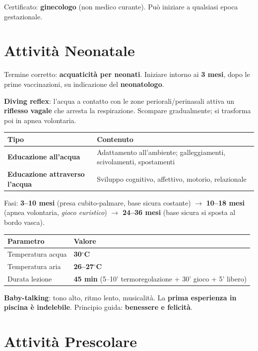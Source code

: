 \documentclass[12pt, a4paper]{article}
\begin{document}
Certificato: \textbf{ginecologo} (non medico curante). Può iniziare a qualsiasi epoca gestazionale.

\section{Attività Neonatale}

Termine corretto: \textbf{acquaticità per neonati}. Iniziare intorno ai \textbf{3 mesi}, dopo le prime vaccinazioni, su indicazione del \textbf{neonatologo}.

\textbf{Diving reflex}: l'acqua a contatto con le zone periorali/perinasali attiva un \textbf{riflesso vagale} che arresta la respirazione. Scompare gradualmente; si trasforma poi in apnea volontaria.

\begin{tabularx}{\textwidth}{lX}
\toprule
\rowcolor{light} \textbf{Tipo} & \textbf{Contenuto} \\
\midrule
\textbf{Educazione all'acqua} & Adattamento all'ambiente; galleggiamenti, scivolamenti, spostamenti \\
\textbf{Educazione attraverso l'acqua} & Sviluppo cognitivo, affettivo, motorio, relazionale \\
\bottomrule
\end{tabularx}

\medskip
Fasi: \textbf{3--10 mesi} (presa cubito-palmare, base sicura costante) $\rightarrow$ \textbf{10--18 mesi} (apnea volontaria, \textit{gioco euristico}) $\rightarrow$ \textbf{24--36 mesi} (base sicura si sposta al bordo vasca).

\begin{tabular}{ll}
\toprule
\rowcolor{light} \textbf{Parametro} & \textbf{Valore} \\
\midrule
Temperatura acqua & \textbf{30$^\circ$C} \\
Temperatura aria & \textbf{26--27$^\circ$C} \\
Durata lezione & \textbf{45 min} (5--10' termoregolazione + 30' gioco + 5' libero) \\
\bottomrule
\end{tabular}

\textbf{Baby-talking}: tono alto, ritmo lento, musicalità. La \textbf{prima esperienza in piscina è indelebile}. Principio guida: \textbf{benessere e felicità}.

\section{Attività Prescolare}
\end{document}

